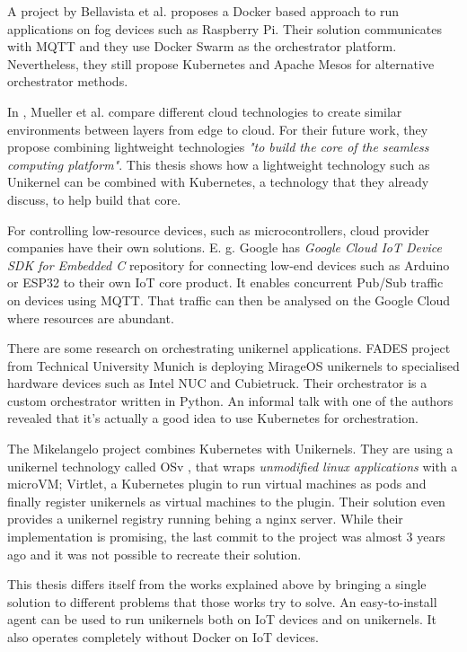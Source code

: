 A project by Bellavista et al. \cite{Bellavista2017} proposes a Docker based approach to run applications on fog devices such as Raspberry Pi. Their solution communicates with MQTT and they use Docker Swarm as the orchestrator platform. Nevertheless, they still propose Kubernetes and Apache Mesos for alternative orchestrator methods.

In \cite{Mueller2017} , Mueller et al. compare different cloud technologies to create similar environments between layers from edge to cloud. For their future work, they propose combining lightweight technologies \textit{"to build the core of the seamless computing platform"}. This thesis shows how a lightweight technology such as Unikernel can be combined with Kubernetes, a technology that they already discuss, to help build that core.

For controlling low-resource devices, such as microcontrollers, cloud provider companies have their own solutions. E. g. Google has \textit{Google Cloud IoT Device SDK for Embedded C} repository for connecting low-end devices such as Arduino or ESP32 to their own IoT core product. It enables concurrent Pub/Sub traffic on devices using MQTT. That traffic can then be analysed on the Google Cloud where resources are abundant.

There are some research on orchestrating unikernel applications. FADES project \cite{fades} from Technical University Munich is deploying MirageOS unikernels to specialised hardware devices such as Intel NUC and Cubietruck. Their orchestrator is a custom orchestrator written in Python. An informal talk with one of the authors revealed that it's actually a good idea to use Kubernetes for orchestration.

The Mikelangelo project \cite{Struckmann2018} combines Kubernetes with Unikernels. They are using a unikernel technology called OSv \cite{osv}, that wraps \textit{unmodified linux applications} with a microVM; Virtlet, a Kubernetes plugin to run virtual machines as pods and finally register unikernels as virtual machines to the plugin. Their solution even provides a unikernel registry running behing a nginx server. While their implementation is promising, the last commit to the project was almost 3 years ago and it was not possible to recreate their solution.

This thesis differs itself from the works explained above by bringing a single solution to different problems that those works try to solve. An easy-to-install agent can be used to run unikernels both on IoT devices and on unikernels. It also operates completely without Docker on IoT devices.